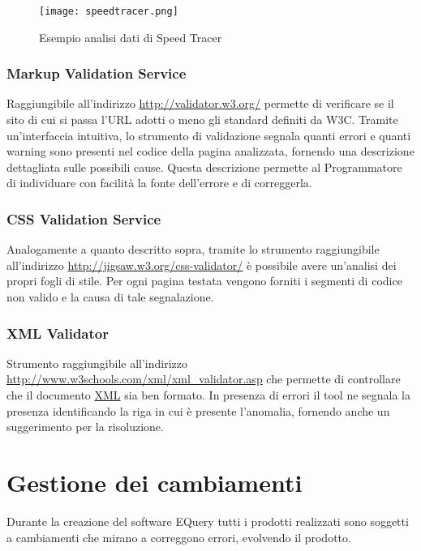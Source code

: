 \documentclass[a4paper,11pt]{article}
\begin{document}
\begin{figure}[h!]
\begin{center}
\texttt{[image: speedtracer.png]}
\end{center}
\caption{Esempio analisi dati di Speed Tracer}
\end{figure}

\subsubsection{Markup Validation Service}
Raggiungibile all'indirizzo \url{http://validator.w3.org/} permette di verificare se il sito di cui si passa l'URL adotti o meno gli standard definiti da W3C. Tramite un'interfaccia intuitiva, lo strumento di validazione segnala quanti errori e quanti warning sono presenti nel codice della pagina analizzata, fornendo una descrizione dettagliata sulle possibili cause. Questa descrizione permette al Programmatore di individuare con facilit\`a la fonte dell'errore e di correggerla.
\newpage
\subsubsection{CSS Validation Service}
Analogamente a quanto descritto sopra, tramite lo strumento raggiungibile all'indirizzo \url{http://jigsaw.w3.org/css-validator/} \`e possibile avere un'analisi dei propri fogli di stile. Per ogni pagina testata vengono forniti i segmenti di codice non valido e la causa di tale segnalazione. 

\subsubsection{XML Validator}
Strumento raggiungibile all'indirizzo \url{http://www.w3schools.com/xml/xml_validator.asp} che permette di controllare che il documento \underline{XML} sia ben formato. In presenza di errori 
il tool ne segnala la presenza identificando la riga in cui \`e presente l'anomalia, fornendo anche un suggerimento per la risoluzione.


\newpage
\section{Gestione dei cambiamenti}
Durante la creazione del software EQuery tutti i prodotti realizzati sono soggetti a cambiamenti che mirano a correggono errori, evolvendo il prodotto.
\end{document}
